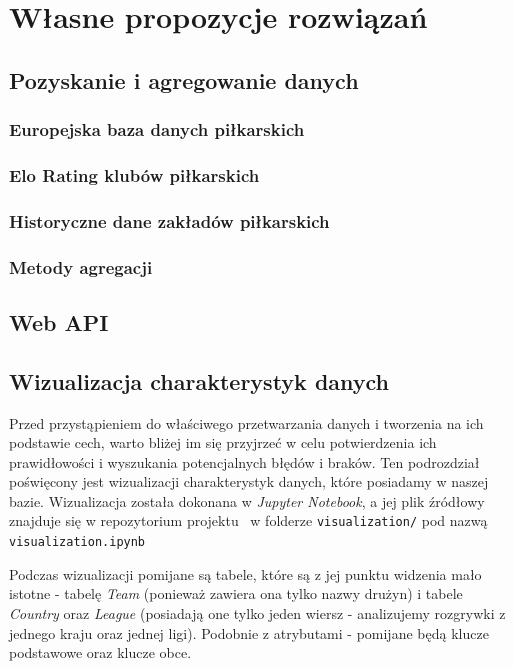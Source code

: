 \chapter{Własne propozycje rozwiązań}
    \section{Pozyskanie i agregowanie danych} \label{data_aggregation}
        \subsection{Europejska baza danych piłkarskich}
        \subsection{Elo Rating klubów piłkarskich}
        \subsection{Historyczne dane zakładów piłkarskich}
        \subsection{Metody agregacji}
    \section{Web API}
    \section{Wizualizacja charakterystyk danych}
    \noindent Przed przystąpieniem do właściwego przetwarzania danych i tworzenia na ich podstawie cech, warto bliżej im się przyjrzeć w celu potwierdzenia ich prawidłowości i wyszukania potencjalnych błędów i braków. Ten podrozdział poświęcony jest wizualizacji charakterystyk danych, które posiadamy w naszej bazie. Wizualizacja została dokonana w \emph{Jupyter Notebook}, a jej plik źródłowy znajduje się w repozytorium projektu~\cite{repo} w folderze \texttt{visualization/} pod nazwą \texttt{visualization.ipynb}
    
    Podczas wizualizacji pomijane są tabele, które są z jej punktu widzenia mało istotne - tabelę \emph{Team} (ponieważ zawiera ona tylko nazwy drużyn) i tabele \emph{Country} oraz \emph{League} (posiadają one tylko jeden wiersz - analizujemy rozgrywki z jednego kraju oraz jednej ligi). Podobnie z atrybutami - pomijane będą klucze podstawowe oraz klucze obce.
    
